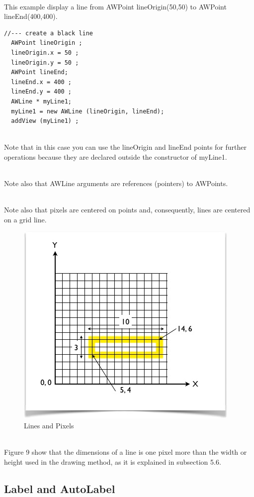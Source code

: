 \documentclass[a4paper,11pt]{extarticle}
\begin{document}
  ~\\ This example display a line from AWPoint lineOrigin(50,50) to AWPoint lineEnd(400,400).

\begin{lstlisting}[language=Arduinonl]
//--- create a black line
  AWPoint lineOrigin ;
  lineOrigin.x = 50 ;
  lineOrigin.y = 50 ;
  AWPoint lineEnd;
  lineEnd.x = 400 ;
  lineEnd.y = 400 ;
  AWLine * myLine1;
  myLine1 = new AWLine (lineOrigin, lineEnd); 
  addView (myLine1) ;
 \end{lstlisting}
~\\ Note that in this case you can use the lineOrigin and lineEnd points for further operations because they are declared outside the constructor of myLine1.

~\\ Note also that AWLine arguments are references (pointers) to AWPoints.

~\\ Note also that pixels are centered on points and, consequently, lines are centered on a grid line.

\begin{figure}[htbp]
   \centering
   \includegraphics[scale=0.7]{AWFig5.png} 
   \caption{Lines and Pixels}
   \label{fig:5 }
\end{figure}

~\\ Figure 9 show that the dimensions of a line is one pixel more than the width or height used in the drawing method, as it is explained in subsection 5.6.

\newpage
\subsection{Label and AutoLabel}
\end{document}
